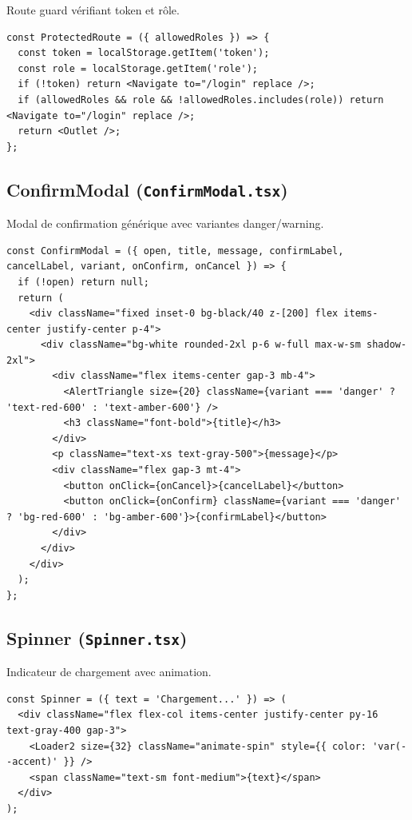 \documentclass[12pt,a4paper]{article}
\begin{document}
Route guard vérifiant token et rôle.

\begin{lstlisting}[style=code]
const ProtectedRoute = ({ allowedRoles }) => {
  const token = localStorage.getItem('token');
  const role = localStorage.getItem('role');
  if (!token) return <Navigate to="/login" replace />;
  if (allowedRoles && role && !allowedRoles.includes(role)) return <Navigate to="/login" replace />;
  return <Outlet />;
};
\end{lstlisting}

\subsection{ConfirmModal (\texttt{ConfirmModal.tsx})}

Modal de confirmation générique avec variantes danger/warning.

\begin{lstlisting}[style=code]
const ConfirmModal = ({ open, title, message, confirmLabel, cancelLabel, variant, onConfirm, onCancel }) => {
  if (!open) return null;
  return (
    <div className="fixed inset-0 bg-black/40 z-[200] flex items-center justify-center p-4">
      <div className="bg-white rounded-2xl p-6 w-full max-w-sm shadow-2xl">
        <div className="flex items-center gap-3 mb-4">
          <AlertTriangle size={20} className={variant === 'danger' ? 'text-red-600' : 'text-amber-600'} />
          <h3 className="font-bold">{title}</h3>
        </div>
        <p className="text-xs text-gray-500">{message}</p>
        <div className="flex gap-3 mt-4">
          <button onClick={onCancel}>{cancelLabel}</button>
          <button onClick={onConfirm} className={variant === 'danger' ? 'bg-red-600' : 'bg-amber-600'}>{confirmLabel}</button>
        </div>
      </div>
    </div>
  );
};
\end{lstlisting}

\subsection{Spinner (\texttt{Spinner.tsx})}

Indicateur de chargement avec animation.

\begin{lstlisting}[style=code]
const Spinner = ({ text = 'Chargement...' }) => (
  <div className="flex flex-col items-center justify-center py-16 text-gray-400 gap-3">
    <Loader2 size={32} className="animate-spin" style={{ color: 'var(--accent)' }} />
    <span className="text-sm font-medium">{text}</span>
  </div>
);
\end{lstlisting}
\end{document}
